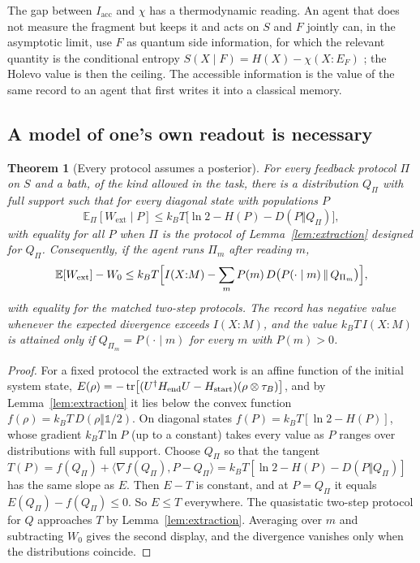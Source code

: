 \documentclass[12pt]{article}
\newtheorem{theorem}{Theorem}
\begin{document}
The gap between $I_{\mathrm{acc}}$ and $\chi$ has a thermodynamic reading. An agent that does not measure the fragment but keeps it and acts on $S$ and $F$ jointly can, in the asymptotic limit, use $F$ as quantum side information, for which the relevant quantity is the conditional entropy $S(X\mid F)=H(X)-\chi(X{:}E_F)$ \cite{delRio2011}; the Holevo value is then the ceiling. The accessible information is the value of the same record to an agent that first writes it into a classical memory.

\subsection{A model of one's own readout is necessary}

\begin{theorem}[Every protocol assumes a posterior]
\label{thm:selfmodel}
For every feedback protocol $\Pi$ on $S$ and a bath, of the kind allowed in the task, there is a distribution $Q_\Pi$ with full support such that for every diagonal state with populations $P$
\[
\mathbb E_\Pi[W_{\mathrm{ext}}\mid P]\le k_BT\bigl[\ln2-H(P)-D(P\Vert Q_\Pi)\bigr],
\]
with equality for all $P$ when $\Pi$ is the protocol of Lemma~\ref{lem:extraction} designed for $Q_\Pi$. Consequently, if the agent runs $\Pi_m$ after reading $m$,
\[
\mathbb E[W_{\mathrm{ext}}]-W_0\le k_BT\Bigl[I(X{:}M)-\sum_mP(m)\,D\bigl(P(\cdot\mid m)\,\Vert\,Q_{\Pi_m}\bigr)\Bigr],
\]
with equality for the matched two-step protocols. The record has negative value whenever the expected divergence exceeds $I(X{:}M)$, and the value $k_BT\,I(X{:}M)$ is attained only if $Q_{\Pi_m}=P(\cdot\mid m)$ for every $m$ with $P(m)>0$.
\end{theorem}

\begin{proof}
For a fixed protocol the extracted work is an affine function of the initial system state, $E(\rho)=-\tr\bigl[(U^\dagger H_{\mathrm{end}}U-H_{\mathrm{start}})(\rho\otimes\tau_B)\bigr]$, and by Lemma~\ref{lem:extraction} it lies below the convex function $f(\rho)=k_BT\,D(\rho\Vert\mathbb 1/2)$. On diagonal states $f(P)=k_BT[\ln2-H(P)]$, whose gradient $k_BT\ln P$ (up to a constant) takes every value as $P$ ranges over distributions with full support. Choose $Q_\Pi$ so that the tangent $T(P)=f(Q_\Pi)+\langle\nabla f(Q_\Pi),P-Q_\Pi\rangle=k_BT[\ln2-H(P)-D(P\Vert Q_\Pi)]$ has the same slope as $E$. Then $E-T$ is constant, and at $P=Q_\Pi$ it equals $E(Q_\Pi)-f(Q_\Pi)\le0$. So $E\le T$ everywhere. The quasistatic two-step protocol for $Q$ approaches $T$ by Lemma~\ref{lem:extraction}. Averaging over $m$ and subtracting $W_0$ gives the second display, and the divergence vanishes only when the distributions coincide.
\end{proof}
\end{document}
